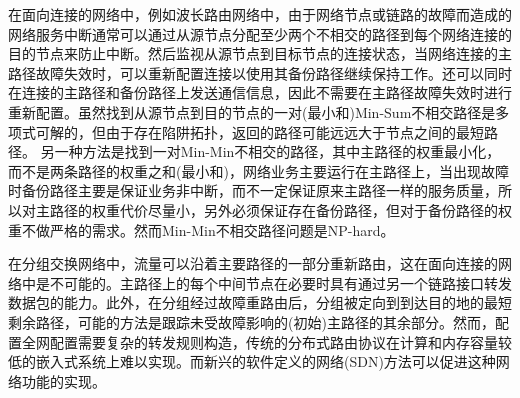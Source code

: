 在面向连接的网络中，例如波长路由网络中，由于网络节点或链路的故障而造成的网络服务中断通常可以通过从源节点分配至少两个不相交的路径到每个网络连接的目的节点来防止中断\cite{kuipers2012overview}。然后监视从源节点到目标节点的连接状态，当网络连接的主路径故障失效时，可以重新配置连接以使用其备份路径继续保持工作。还可以同时在连接的主路径和备份路径上发送通信信息，因此不需要在主路径故障失效时进行重新配置。虽然找到从源节点到目的节点的一对(最小和)Min-Sum不相交路径是多项式可解的\cite{suurballe1974disjoint,suurballe1984quick}，但由于存在陷阱拓扑\cite{dunn1994comparison}，返回的路径可能远远大于节点之间的最短路径\cite{dunn1994comparison}。 另一种方法是找到一对Min-Min不相交的路径，其中主路径的权重最小化，而不是两条路径的权重之和(最小和)，网络业务主要运行在主路径上，当出现故障时备份路径主要是保证业务非中断，而不一定保证原来主路径一样的服务质量，所以对主路径的权重代价尽量小，另外必须保证存在备份路径，但对于备份路径的权重不做严格的需求。然而Min-Min不相交路径问题是NP-hard\cite{guo2013finding}。




在分组交换网络中，流量可以沿着主要路径的一部分重新路由，这在面向连接的网络中是不可能的。主路径上的每个中间节点在必要时具有通过另一个链路接口转发数据包的能力。此外，在分组经过故障重路由后，分组被定向到到达目的地的最短剩余路径，可能的方法是跟踪未受故障影响的(初始)主路径的其余部分。然而，配置全网配置需要复杂的转发规则构造，传统的分布式路由协议在计算和内存容量较低的嵌入式系统上难以实现。而新兴的软件定义的网络(SDN)方法可以促进这种网络功能的实现。






